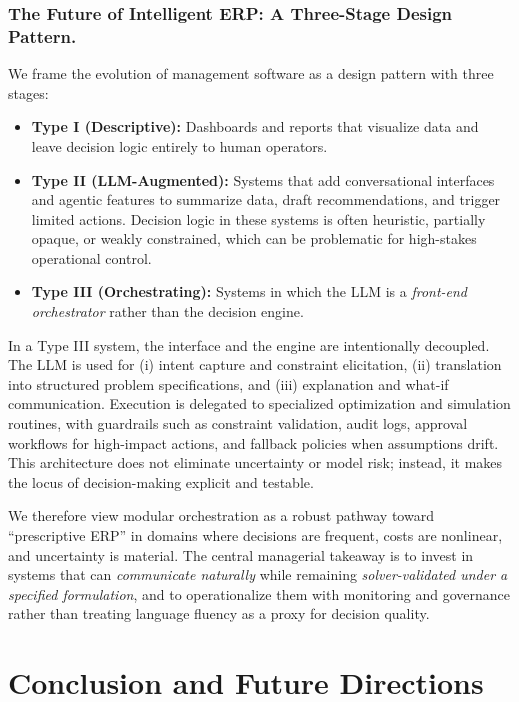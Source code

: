 \documentclass[mnsc,nonblindrev]{informs3_hide}
\begin{document}
\subsubsection*{The Future of Intelligent ERP: A Three-Stage Design Pattern.}
We frame the evolution of management software as a design pattern with three stages:
\begin{itemize}
    \item \textbf{Type I (Descriptive):} Dashboards and reports that visualize data and leave decision logic entirely to human operators.
    \item \textbf{Type II (LLM-Augmented):} Systems that add conversational interfaces and agentic features to summarize data, draft recommendations, and trigger limited actions. Decision logic in these systems is often heuristic, partially opaque, or weakly constrained, which can be problematic for high-stakes operational control.
    \item \textbf{Type III (Orchestrating):} Systems in which the LLM is a \emph{front-end orchestrator} rather than the decision engine.
\end{itemize}

In a Type III system, the interface and the engine are intentionally decoupled. The LLM is used for (i) intent capture and constraint elicitation, (ii) translation into structured problem specifications, and (iii) explanation and what-if communication. Execution is delegated to specialized optimization and simulation routines, with guardrails such as constraint validation, audit logs, approval workflows for high-impact actions, and fallback policies when assumptions drift. This architecture does not eliminate uncertainty or model risk; instead, it makes the locus of decision-making explicit and testable.

We therefore view modular orchestration as a robust pathway toward ``prescriptive ERP'' in domains where decisions are frequent, costs are nonlinear, and uncertainty is material. The central managerial takeaway is to invest in systems that can \emph{communicate naturally} while remaining \emph{solver-validated under a specified formulation}, and to operationalize them with monitoring and governance rather than treating language fluency as a proxy for decision quality.



\section{Conclusion and Future Directions}
\label{sec:conclusion}
\end{document}
